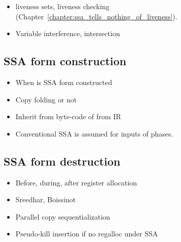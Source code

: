\begin{itemize}

\item liveness sets, liveness checking
(Chapter~\ref{chapter:ssa_tells_nothing_of_liveness}).

\item Variable interference, intersection

\end{itemize}


\subsection{SSA form construction}

\begin{itemize}

\item When is SSA form constructed

\item Copy folding or not

\item Inherit from byte-code of from IR

\item Conventional SSA is assumed for inputs of phases.

\end{itemize}

\subsection{SSA form destruction}

\begin{itemize}

\item Before, during, after register allocation

\item Sreedhar, Boissinot

\item Parallel copy sequentialization

\item Pseudo-kill insertion if no regalloc under SSA

\end{itemize}

